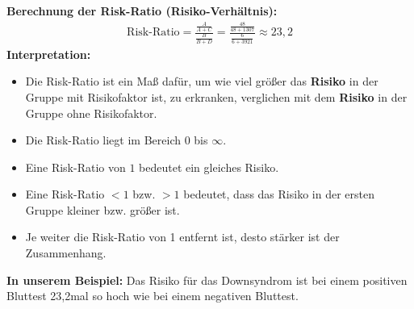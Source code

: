 \documentclass[t,11pt,aspectratio=169]{beamer}
\begin{document}
\begin{frame}
\textbf{Berechnung der Risk-Ratio (Risiko-Verhältnis):}
\begin{align*}
\text{Risk-Ratio} = \frac{\frac{A}{A+C}}{\frac{B}{B+D}} = \frac{\frac{48}{48+1307}}{\frac{6}{6+3921}} \approx 23,2
\end{align*}
\textbf{Interpretation:}
\begin{itemize}
	\item Die Risk-Ratio ist ein Maß dafür, um wie viel größer das \textbf{Risiko} in der Gruppe mit Risikofaktor ist, zu erkranken, verglichen mit dem \textbf{Risiko} in der Gruppe ohne Risikofaktor.
	\item Die Risk-Ratio liegt im Bereich $0$ bis $\infty$.
	\item Eine Risk-Ratio von $1$ bedeutet ein gleiches Risiko.
	\item Eine Risk-Ratio $<1$ bzw. $>1$ bedeutet, dass das Risiko in der ersten Gruppe kleiner bzw. größer ist.
	\item Je weiter die Risk-Ratio von 1 entfernt ist, desto stärker ist der Zusammenhang.
\end{itemize}
\pause
\vfill
\textbf{In unserem Beispiel:} Das Risiko für das Downsyndrom ist bei einem positiven Bluttest 23,2mal so hoch wie bei einem negativen Bluttest.
\end{frame}
\end{document}
